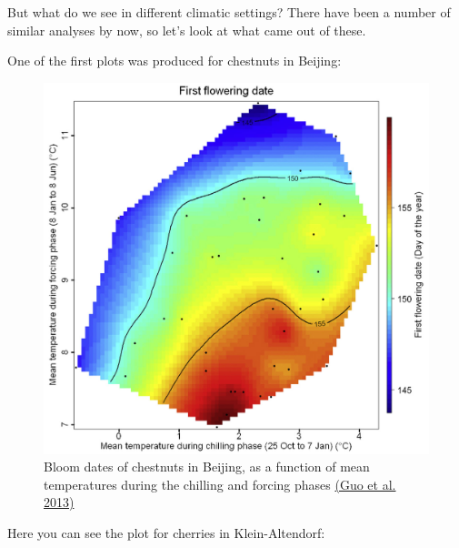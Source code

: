 \documentclass[
]{book}
\begin{document}
But what do we see in different climatic settings? There have been a number of similar analyses by now, so let's look at what came out of these.

One of the first plots was produced for chestnuts in Beijing:

\begin{figure}
\centering
\includegraphics{pictures/Rainbow_chestnuts.jpg}
\caption{Bloom dates of chestnuts in Beijing, as a function of mean temperatures during the chilling and forcing phases \href{https://www.sciencedirect.com/science/article/abs/pii/S0168192313001627}{(Guo et al. \protect\hyperlink{ref-guo2013response}{2013})}}
\end{figure}

Here you can see the plot for cherries in Klein-Altendorf:
\end{document}
